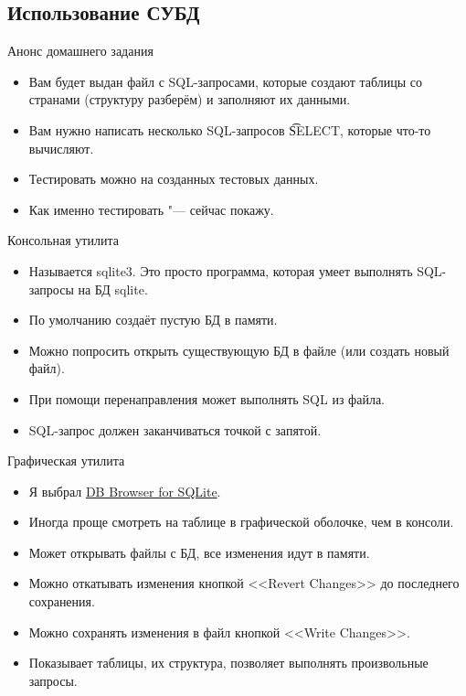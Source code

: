 \subsection{Использование СУБД}

\begin{frame}
\end{frame}

\begin{frame}{Анонс домашнего задания}
	\begin{itemize}
		\item Вам будет выдан файл с SQL-запросами, которые создают таблицы со странами (структуру разберём) и заполняют их данными.
		\item Вам нужно написать несколько SQL-запросов \t{SELECT}, которые что-то вычисляют.
		\item Тестировать можно на созданных тестовых данных.
		\item Как именно тестировать "--- сейчас покажу.
	\end{itemize}
\end{frame}

\begin{frame}{Консольная утилита}
	\begin{itemize}
		\item Называется sqlite3. Это просто программа, которая умеет выполнять SQL-запросы на БД sqlite.
		\item По умолчанию создаёт пустую БД в памяти.
		\item Можно попросить открыть существующую БД в файле (или создать новый файл).
		\item При помощи перенаправления может выполнять SQL из файла.
		\item SQL-запрос должен заканчиваться точкой с запятой.
	\end{itemize}
\end{frame}

\begin{frame}{Графическая утилита}
	\begin{itemize}
		\item Я выбрал \href{http://sqlitebrowser.org/}{DB Browser for SQLite}.
		\item Иногда проще смотреть на таблице в графической оболочке, чем в консоли.
		\item Может открывать файлы с БД, все изменения идут в памяти.
		\item Можно откатывать изменения кнопкой <<Revert Changes>> до последнего сохранения.
		\item Можно сохранять изменения в файл кнопкой <<Write Changes>>.
		\item Показывает таблицы, их структура, позволяет выполнять произвольные запросы.
	\end{itemize}
\end{frame}

